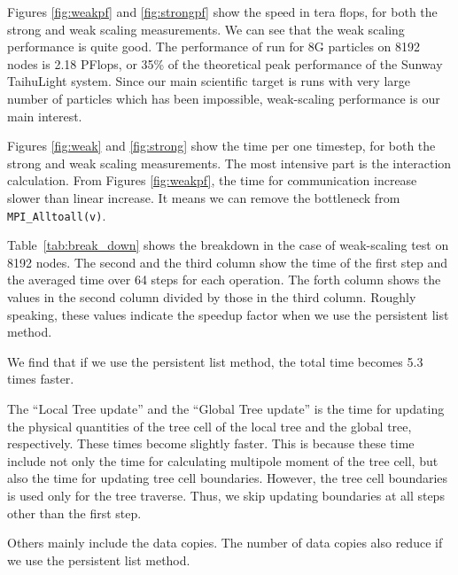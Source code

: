 \documentclass[oribibl]{llncs}
\begin{document}
Figures \ref{fig:weakpf} and \ref{fig:strongpf} show the speed in tera
flops, for both the strong and weak scaling measurements. We can see
that the weak scaling performance is quite good. The performance of
run for 8G particles on 8192 nodes is 2.18 PFlops, or 35\% of the
theoretical peak performance of the Sunway TaihuLight system. Since
our main scientific target is runs with very large number of particles
which has been impossible, weak-scaling performance is our main
interest.

Figures \ref{fig:weak} and \ref{fig:strong} show the time per one
timestep, for both the strong and weak scaling measurements. The most
intensive part is the interaction calculation. From Figures
\ref{fig:weakpf}, the time for communication increase slower than
linear increase. It means we can remove the bottleneck from {\tt
  MPI\_Alltoall(v)}.

Table~\ref{tab:break_down} shows the breakdown in the case of
weak-scaling test on 8192 nodes. The second and the third column show
the time of the first step and the averaged time over 64 steps for
each operation. The forth column shows the values in the second column
divided by those in the third column. Roughly speaking, these values
indicate the speedup factor when we use the persistent list method.

We find that if we use the persistent list method, the total time
becomes 5.3 times faster.

The ``Local Tree update'' and the ``Global Tree update'' is the time
for updating the physical quantities of the tree cell of the local
tree and the global tree, respectively. These times become slightly
faster. This is because these time include not only the time for
calculating multipole moment of the tree cell, but also the time for
updating tree cell boundaries. However, the tree cell boundaries is
used only for the tree traverse. Thus, we skip updating boundaries at
all steps other than the first step.

Others mainly include the data copies. The number of data copies also
reduce if we use the persistent list method.
\end{document}

